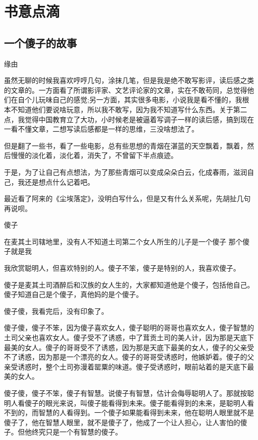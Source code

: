 \chapter{书意点滴}
\section*{一个傻子的故事}

缘由

虽然无聊的时候我喜欢哼哼几句，涂抹几笔，但是我是绝不敢写影评，读后感之类的文章的。一方面看了所谓影评家、文艺评论家的文章，实在不敢苟同，总觉得他们在自个儿玩味自己的感觉;另一方面，其实很多电影，小说我是看不懂的，我根本不知道他们要说啥玩意，所以我不敢写，因为我不知道写什么东西。关于第二点，我觉得中国教育立了大功，小时候老是被逼着写调子一样的读后感，搞到现在一看不懂文章，二想写读后感都是一样的思维，三没啥想法了。

但是翻了一些书，看了一些电影，总有些思想的青烟在湛蓝的天空飘着，飘着，然后慢慢的淡化着，淡化着，消失了，不曾留下半点痕迹。

于是，为了让自己有点想法，为了那些青烟可以变成朵朵白云，化成春雨，滋润自己，我还是想点什么记着吧。

最近看了阿来的《尘埃落定》，没明白写什么，但是又有什么关系呢，先胡扯几句再说呗。

傻子

在麦其土司辖地里，没有人不知道土司第二个女人所生的儿子是一个傻子
那个傻子就是我

我欣赏聪明人，但喜欢特别的人。傻子不笨，傻子是特别的人，我喜欢傻子。

傻子是麦其土司酒醉后和汉族的女人生的，大家都知道他是个傻子，包括他自己。傻子知道自己是个傻子，真他妈的是个傻子。

傻子傻，我看完后，没有印象了。

傻子傻，傻子不笨，因为傻子喜欢女人，傻子聪明的哥哥也喜欢女人，傻子智慧的土司父亲也喜欢女人。傻子受不了诱惑，中了茸贡土司的美人计，因为那是天底下最美的女人。傻子的哥哥受不了诱惑，因为那是天底下最美的女人，傻子的父亲受不了诱惑，因为那是一个漂亮的女人。傻子的哥哥受诱惑时，他嫉妒着。傻子的父亲受诱惑时，整个土司弥漫着罂粟的味道。傻子受诱惑时，眼前站着的是天底下最美的女人。

傻子傻，傻子不笨，傻子有智慧。说傻子有智慧，估计会侮辱聪明人了。那就按聪明人看傻子的眼光来说，叫傻子能看得到未来。傻子能看得到的未来，是聪明人看不到的，而智慧的人看得到。一个傻子如果能看得到未来，他在聪明人眼里就不是傻子了，他在智慧人眼里，就不是傻子了，他成了一个让人担心，让人害怕的傻子。但他终究只是一个有智慧的傻子。


